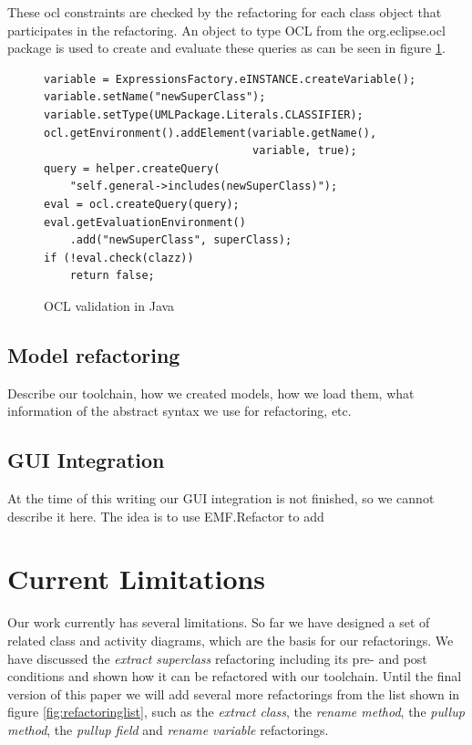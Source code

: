 \documentclass{llncs}
\begin{document}
These ocl constraints are checked by the refactoring for each class object that participates
in the refactoring. An object to type OCL from the org.eclipse.ocl package is used to create and evaluate these queries
as can be seen in figure \ref{lst:ocl}.

\begin{figure}
\begin{lstlisting}
variable = ExpressionsFactory.eINSTANCE.createVariable();
variable.setName("newSuperClass");
variable.setType(UMLPackage.Literals.CLASSIFIER);
ocl.getEnvironment().addElement(variable.getName(),
                                variable, true);
query = helper.createQuery(
    "self.general->includes(newSuperClass)");
eval = ocl.createQuery(query);
eval.getEvaluationEnvironment()
    .add("newSuperClass", superClass);
if (!eval.check(clazz))
    return false;
\end{lstlisting}
\caption{OCL validation in Java}
\label{lst:ocl}
\end{figure}



\subsection{Model refactoring}
Describe our toolchain, how we created models, how we load them, what information of the abstract syntax we use for refactoring, etc.

\subsection{GUI Integration}
At the time of this writing our GUI integration is not finished, so we cannot describe it here. The idea is to use EMF.Refactor to add 

\section{Current Limitations}
Our work currently has several limitations. So far we have designed a set of related class and activity diagrams,
which are the basis for our refactorings. We have discussed the \textit{extract superclass} refactoring including its
pre- and post conditions and shown how it can be refactored with our toolchain. Until the final version of this
paper we will add several more refactorings from the list shown in figure \ref{fig:refactoringlist}, such as the
\textit{extract class}, the \textit{rename method}, the \textit{pullup method}, the \textit{pullup field} and 
\textit{rename variable} refactorings.
\end{document}
